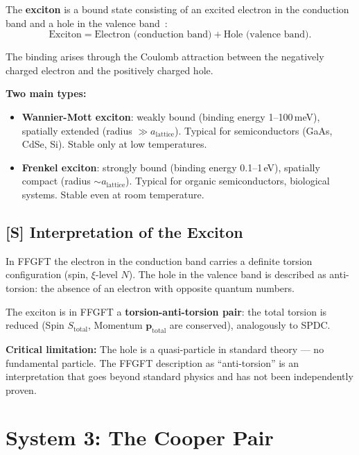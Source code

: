 The \textbf{exciton} is a bound state consisting of an
excited electron in the conduction band and a hole
in the valence band~\cite{Wannier1937,Frenkel1931}:
\begin{equation}
  \text{Exciton} = \text{Electron (conduction band)} + \text{Hole (valence band)}.
\end{equation}

The binding arises through the Coulomb attraction between the
negatively charged electron and the positively charged hole.

\textbf{Two main types:}
\begin{itemize}
  \item \textbf{Wannier-Mott exciton}: weakly bound
    (binding energy 1--100\,meV), spatially extended
    (radius $\gg a_\text{lattice}$). Typical for semiconductors
    (GaAs, CdSe, Si). Stable only at low temperatures.
  \item \textbf{Frenkel exciton}: strongly bound
    (binding energy 0.1--1\,eV), spatially compact
    (radius $\sim a_\text{lattice}$). Typical for organic
    semiconductors, biological systems. Stable even at room temperature.
\end{itemize}

\subsection{[S] Interpretation of the Exciton}

\begin{foundation}
In FFGFT the electron in the conduction band carries
a definite torsion configuration (spin, $\xi$-level $N$).
The hole in the valence band is described as
anti-torsion: the absence of an electron with
opposite quantum numbers.

The exciton is in FFGFT a \textbf{torsion-anti-torsion pair}:
the total torsion is reduced (Spin $S_\text{total}$,
Momentum $\mathbf{p}_\text{total}$ are conserved),
analogously to SPDC.

\textbf{Critical limitation:}
The hole is a quasi-particle in standard theory ---
no fundamental particle. The FFGFT description as
``anti-torsion'' is an interpretation that goes beyond
standard physics and has not been independently proven.
\end{foundation}

\section{System 3: The Cooper Pair}
\label{sec:cooper-pair}

